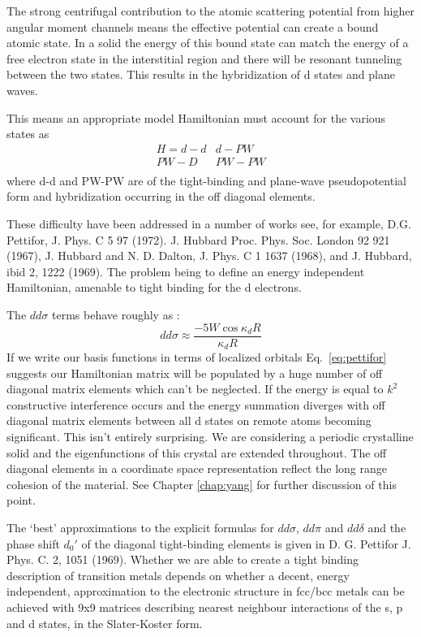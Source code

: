 \documentclass{article}
\begin{document}
The strong centrifugal contribution to the
atomic scattering potential from higher angular moment channels means the effective potential
can create a bound atomic state. In a solid the energy of this bound state can match the 
energy of a free electron state in the interstitial region and there will
be resonant tunneling between the two states. This results in the hybridization of d states
and plane waves. 

This means an appropriate model Hamiltonian must account for the various states as
%
\begin{eqnarray}
\label{eq:d-hamiltonian}
H = d-d  & d-PW \\
    PW-D & PW-PW \\
\end{eqnarray}
%
where d-d and PW-PW are of the tight-binding and plane-wave 
pseudopotential form and hybridization occurring in the 
off diagonal elements. 

These difficulty have been addressed in a number of works 
see, for example, D.G. Pettifor, J. Phys. C 5 97 (1972).
J. Hubbard Proc. Phys. Soc. London 92 921 (1967),
J. Hubbard and N. D. Dalton, J. Phys. C 1 1637 (1968),
and J. Hubbard, ibid 2, 1222 (1969). The problem being to define an
energy independent Hamiltonian, amenable to tight binding for the d electrons.

The $dd\sigma$ terms behave roughly as \cite{pettifor71}:
%
\begin{equation}
\label{eq:pettifor}
dd\sigma \approx \frac{-5W\cos\kappa_{d}R}{\kappa_{d}R}
\end{equation}
%
If we write our basis functions in terms of localized orbitals
Eq.~\ref{eq:pettifor} suggests our Hamiltonian matrix will be 
populated by a huge number of off diagonal matrix elements which can't be neglected. If 
the energy is equal to $k^{2}$ constructive interference occurs and the energy summation
diverges with off diagonal matrix elements between all d states on remote atoms becoming
significant. This isn't entirely surprising. We are considering a periodic crystalline solid
and the eigenfunctions of this crystal are extended throughout. The off diagonal elements
in a coordinate space representation reflect the long range cohesion of the material. See
Chapter \ref{chap:yang} for further discussion of this point.

The `best' approximations to the explicit formulas for $dd\sigma$, $dd\pi$ and $dd\delta$ and the phase
shift $d_{0}'$ of the diagonal tight-binding elements is given in D. G. Pettifor J. Phys. C. 2, 1051 (1969).
Whether we are able to create a tight binding description of transition metals
depends on whether a decent, energy independent, approximation to the electronic structure in fcc/bcc metals
can be achieved with 9x9 matrices describing nearest neighbour interactions of the s, p and d states,
in the Slater-Koster form.\cite{salter54}
\end{document}
